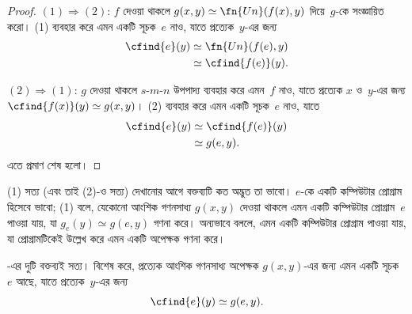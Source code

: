 \documentclass[../../../include/open-logic-section]{subfiles}
\begin{document}
\begin{proof}
$(1) \Rightarrow (2)$: $f$ দেওয়া থাকলে $g(x,y) \simeq
\fn{Un}(f(x),y)$ দিয়ে~$g$-কে সংজ্ঞায়িত করো। (1) ব্যবহার করে এমন একটি
সূচক~$e$ নাও, যাতে প্রত্যেক~$y$-এর জন্য
\begin{align*}
\cfind{e}(y) & \simeq \fn{Un}(f(e),y) \\
& \simeq \cfind{f(e)}(y).
\end{align*}

$(2) \Rightarrow (1)$: $g$ দেওয়া থাকলে $s$-$m$-$n$ উপপাদ্য ব্যবহার
করে এমন~$f$ নাও, যাতে প্রত্যেক $x$ ও~$y$-এর জন্য
$\cfind{f(x)}(y) \simeq g(x,y)$। (2) ব্যবহার করে এমন একটি সূচক~$e$ নাও,
যাতে
\begin{align*}
\cfind{e}(y) & \simeq \cfind{f(e)}(y) \\
& \simeq g(e,y).
\end{align*}
এতে প্রমাণ শেষ হলো।
\end{proof}

\begin{explain}
(1) সত্য (এবং তাই (2)-ও সত্য) দেখানোর আগে বক্তব্যটি কত অদ্ভুত তা ভাবো।
$e$-কে একটি কম্পিউটার প্রোগ্রাম হিসেবে ভাবো; (1) বলে, যেকোনো আংশিক
গণনসাধ্য $g(x,y)$ দেওয়া থাকলে এমন একটি কম্পিউটার প্রোগ্রাম~$e$ পাওয়া
যায়, যা $g_e(y) \simeq g(e,y)$ গণনা করে। অন্যভাবে বললে, এমন একটি
কম্পিউটার প্রোগ্রাম পাওয়া যায়, যা প্রোগ্রামটিকেই উল্লেখ করে এমন একটি
অপেক্ষক গণনা করে।
\end{explain}

\begin{thm}
-এর দুটি বক্তব্যই সত্য। বিশেষ করে, প্রত্যেক আংশিক
গণনসাধ্য অপেক্ষক $g(x,y)$-এর জন্য এমন একটি সূচক~$e$ আছে, যাতে
প্রত্যেক~$y$-এর জন্য
\[
\cfind{e}(y) \simeq g(e,y).
\]
\end{thm}
\end{document}
